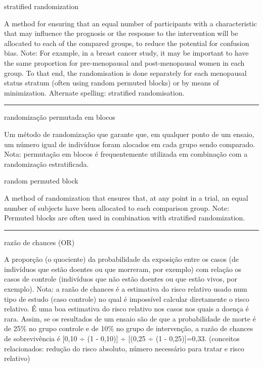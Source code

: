 \documentclass[
]{book}
\begin{document}
stratified randomization

A method for ensuring that an equal number of participants with a characteristic that may influence the prognosis or the response to the intervention will be allocated to each of the compared groups, to reduce the potential for confusion bias. Note: For example, in a breast cancer study, it may be important to have the same proportion for pre-menopausal and post-menopausal women in each group. To that end, the randomisation is done separately for each menopausal status stratum (often using random permuted blocks) or by means of minimization. Alternate spelling: stratified randomisation.

\begin{center}\rule{0.5\linewidth}{0.5pt}\end{center}

randomização permutada em blocos

Um método de randomização que garante que, em qualquer ponto de um ensaio, um número igual de indivíduos foram alocados em cada grupo sendo comparado. Nota: permutação em blocos é frequentemente utilizada em combinação com a randomização estratificada.

random permuted block

A method of randomization that ensures that, at any point in a trial, an equal number of subjects have been allocated to each comparison group. Note: Permuted blocks are often used in combination with stratified randomization.

\begin{center}\rule{0.5\linewidth}{0.5pt}\end{center}

razão de chances (OR)

A proporção (o quociente) da probabilidade da exposição entre os casos (de indivíduos que estão doentes ou que morreram, por exemplo) com relação os casos de controle (indivíduos que não estão doentes ou que estão vivos, por exemplo). Nota: a razão de chances é a estimativa do risco relativo usado num tipo de estudo (caso controle) no qual é impossível calcular diretamente o risco relativo. É uma boa estimativa do risco relativo nos casos nos quais a doença é rara. Assim, se os resultados de um ensaio são de que a probabilidade de morte é de 25\% no grupo controle e de 10\% no grupo de intervenção, a razão de chances de sobrevivência é {[}0,10 ÷ (1 - 0,10){]} ÷ {[}(0,25 ÷ (1 - 0,25){]}=0,33. (conceitos relacionados: redução do risco absoluto, número necessário para tratar e risco relativo)
\end{document}
